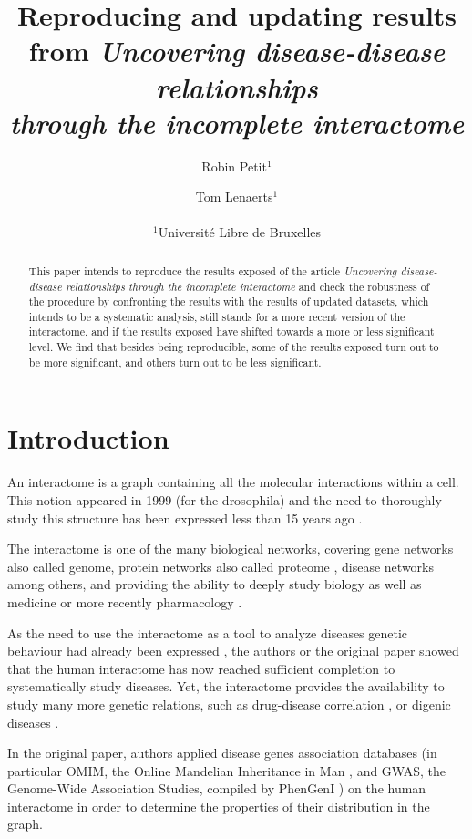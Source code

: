 \documentclass[letterpaper]{article}
\title{Reproducing and updating results from
\textit{Uncovering disease-disease relationships\\through the incomplete interactome}}
\author{Robin Petit$^{1}$ \and Tom Lenaerts$^{1}$\\
\mbox{}\\
$^1$Université Libre de Bruxelles}
\begin{document}
\maketitle

\begin{abstract}
  This paper intends to reproduce the results exposed of the article \textit{Uncovering
	disease-disease relationships through the incomplete interactome} \citep{originalPaper}
	and check the robustness of the procedure by confronting the results with the results of
	updated datasets, which intends to be a systematic analysis, still stands for a more
	recent version of the interactome, and if the results exposed have shifted towards a more
	or less significant level. We find that besides being reproducible, some of the results
	exposed turn out to be more significant, and others turn out to be less significant.
\end{abstract}

\section{Introduction}
An interactome is a graph containing all the molecular interactions within a cell. This notion appeared
in 1999 (for the drosophila) \citep{sanchez1999grasping} and the need to thoroughly study this structure has
been expressed less than 15 years ago \citep{UnderstandingTheCellFunctionalOrganization}.

The interactome is one of the many biological networks, covering gene networks also called genome,
protein networks also called proteome \citep{rolland2014proteome}, disease networks \citep{goh2007human} among
others, and providing the ability to deeply study biology \citep{UnderstandingTheCellFunctionalOrganization} as
well as medicine \citep{barabasi2011network} or more recently pharmacology \citep{hopkins2008network}.

As the need to use the interactome as a tool to analyze diseases genetic behaviour had already been
expressed \citep{vidal2011interactome}, the authors or the original paper \citep{originalPaper} showed
that the human interactome has now reached sufficient completion to systematically study diseases. Yet,
the interactome provides the availability to study many more genetic relations, such as drug-disease
correlation \citep{Yu2016extraction}, or digenic diseases \citep{gazzo2015dida}.

In the original paper, authors applied disease genes association databases (in particular
OMIM, the Online Mandelian Inheritance in Man \citep{amberger2008OMIM}, and GWAS, the Genome-Wide Association
Studies, compiled by PhenGenI \citep{ramos2014PhenGenI}) on the human interactome in order to determine
the properties of their distribution in the graph.
\end{document}
